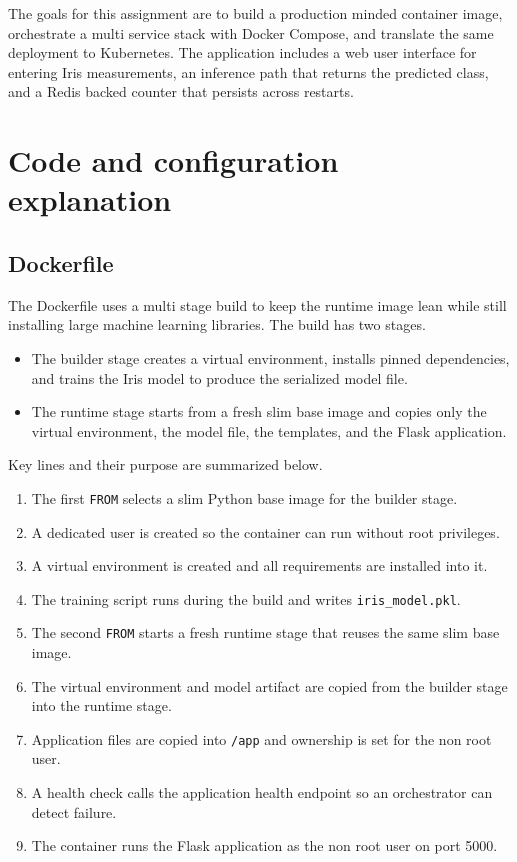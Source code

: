 The goals for this assignment are to build a production minded container image, orchestrate a multi service stack with Docker Compose, and translate the same deployment to Kubernetes. The application includes a web user interface for entering Iris measurements, an inference path that returns the predicted class, and a Redis backed counter that persists across restarts.

\section{Code and configuration explanation}

\subsection{Dockerfile}
The Dockerfile uses a multi stage build to keep the runtime image lean while still installing large machine learning libraries. The build has two stages.

\begin{itemize}
  \item The builder stage creates a virtual environment, installs pinned dependencies, and trains the Iris model to produce the serialized model file.
  \item The runtime stage starts from a fresh slim base image and copies only the virtual environment, the model file, the templates, and the Flask application.
\end{itemize}

Key lines and their purpose are summarized below.

\begin{enumerate}
  \item The first \texttt{FROM} selects a slim Python base image for the builder stage.
  \item A dedicated user is created so the container can run without root privileges.
  \item A virtual environment is created and all requirements are installed into it.
  \item The training script runs during the build and writes \texttt{iris\_model.pkl}.
  \item The second \texttt{FROM} starts a fresh runtime stage that reuses the same slim base image.
  \item The virtual environment and model artifact are copied from the builder stage into the runtime stage.
  \item Application files are copied into \texttt{/app} and ownership is set for the non root user.
  \item A health check calls the application health endpoint so an orchestrator can detect failure.
  \item The container runs the Flask application as the non root user on port 5000.
\end{enumerate}

